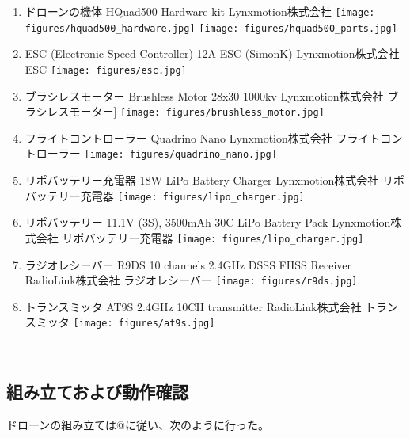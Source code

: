 \begin{enumerate}
\renewcommand{\labelenumi}{(\arabic{enumi})}
\item
  ドローンの機体 HQuad500 Hardware kit Lynxmotion株式会社
  \cite{hquad500_hardware:online}
  \cite{hquad500_hardware}
  \texttt{[image: figures/hquad500\_hardware.jpg]}
  \texttt{[image: figures/hquad500\_parts.jpg]}
\item
  ESC (Electronic Speed Controller) 12A ESC (SimonK) Lynxmotion株式会社
  \cite{http://www.lynxmotion.com/p-915-12a-esc-simonk.aspx}{ESC}
  \texttt{[image: figures/esc.jpg]}
\item
  ブラシレスモーター Brushless Motor 28x30 1000kv Lynxmotion株式会社
  \cite{http://www.lynxmotion.com/p-913-brushless-motor-28x30-1000kv.aspx}{ブラシレスモーター}{]}
  \texttt{[image: figures/brushless\_motor.jpg]}
\item
  フライトコントローラー Quadrino Nano Lynxmotion株式会社
  \cite{http://www.lynxmotion.com/p-1020-lynxmotion-quadrino-nano-flight-controller-with-gps.aspx}{フライトコントローラー}
  \texttt{[image: figures/quadrino\_nano.jpg]}
\item
  リポバッテリー充電器 18W LiPo Battery Charger Lynxmotion株式会社
  \cite{http://www.lynxmotion.com/p-985-18w-lipo-battery-charger.aspx}{リポバッテリー充電器}
  \texttt{[image: figures/lipo\_charger.jpg]}
\item
  リポバッテリー 11.1V (3S), 3500mAh 30C LiPo Battery Pack
  Lynxmotion株式会社
  \cite{http://www.lynxmotion.com/p-985-18w-lipo-battery-charger.aspx}{リポバッテリー充電器}
  \texttt{[image: figures/lipo\_charger.jpg]}
\item
  ラジオレシーバー R9DS 10 channels 2.4GHz DSSS FHSS Receiver
  RadioLink株式会社
  \cite{http://www.radiolink.com.cn/doce/product-detail-120.html}{ラジオレシーバー}
  \texttt{[image: figures/r9ds.jpg]}
\item
  トランスミッタ AT9S 2.4GHz 10CH transmitter RadioLink株式会社
  \cite{http://www.radiolink.com.cn/doce/product-detail-119.html}{トランスミッタ}
  \texttt{[image: figures/at9s.jpg]}
\end{enumerate}

\
\subsection{組み立ておよび動作確認}\label{assembly-drone}

ドローンの組み立ては@に従い、次のように行った。

